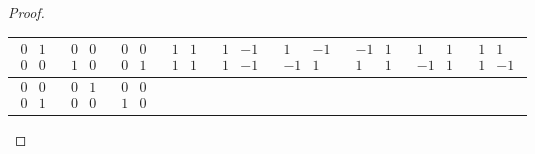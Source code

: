 \begin{proof}
    \begin{tabular}{c|c|c|c|c|c|c|c|c}
    $\begin{matrix}
        0    &   1    \\
        0    &   0
    \end{matrix}$
    &
    $\begin{matrix}
        0    &   0    \\
        1    &   0
    \end{matrix}$
    &
    $\begin{matrix}
        0    &   0    \\
        0    &   1
    \end{matrix}$
    &
    $\begin{matrix}
        1    &   1    \\
        1    &   1
    \end{matrix}$
    &
    $\begin{matrix}
        1    &   -1    \\
        1    &   -1
    \end{matrix}$
    &
    $\begin{matrix}
        1    &   -1    \\
        -1    &   1
    \end{matrix}$
    &
    $\begin{matrix}
        -1    &   1    \\
        1    &   1
    \end{matrix}$
    &
    $\begin{matrix}
        1    &   1    \\
        -1    &   1
    \end{matrix}$
    &
    $\begin{matrix}
        1    &   1    \\
        1    &   -1
    \end{matrix}$\\
    \hline
$\begin{matrix}
        0    &   0    \\
        0    &   1
    \end{matrix}$
    &
    $\begin{matrix}
        0    &   1    \\
        0    &   0
    \end{matrix}$
    &
    $\begin{matrix}
        0    &   0    \\
        1    &   0
    \end{matrix}$

\end{tabular}
\end{proof}
